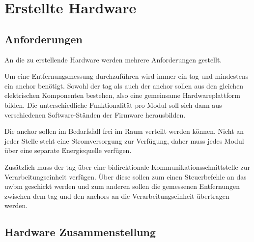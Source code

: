 \section{Erstellte Hardware}


%
%
\subsection{Anforderungen}

An die zu erstellende Hardware werden mehrere Anforderungen gestellt.

Um eine Entfernungsmessung durchzuführen wird immer ein \Gls{tag} und mindestens ein \Gls{anchor} benötigt. Sowohl der \Gls{tag} als auch der \Gls{anchor} sollen aus den gleichen elektrischen Komponenten bestehen, also eine gemeinsame Hardwareplattform bilden. Die unterschiedliche Funktionalität pro Modul soll sich dann aus verschiedenen Software-Ständen der Firmware herausbilden.

Die \Gls{anchor} sollen im Bedarfsfall frei im Raum verteilt werden können. Nicht an jeder Stelle steht eine Stromversorgung zur Verfügung, daher muss jedes Modul über eine separate Energiequelle verfügen.

Zusätzlich muss der \Gls{tag} über eine bidirektionale Kommunikationsschnittstelle zur Verarbeitungseinheit verfügen. Über diese sollen zum einen Steuerbefehle an das \Gls{uwbm} geschickt werden und zum anderen sollen die gemessenen Entfernungen zwischen dem \Gls{tag} und den \Glspl{anchor} an die Verarbeitungseinheit übertragen werden.


%
%
\subsection{Hardware Zusammenstellung}


%
%
%
